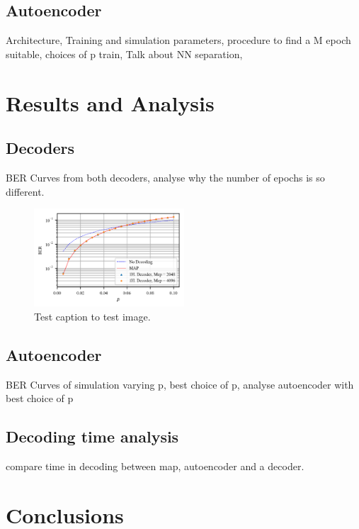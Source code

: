 \documentclass[conference]{IEEEtran}
\begin{document}
\subsection{Autoencoder}
Architecture, Training and simulation parameters, procedure to find a M epoch suitable, choices of p train, Talk about NN separation, 


\section{Results and Analysis}

\subsection{Decoders}
BER Curves from both decoders, analyse why the number of epochs is so different. 

\begin{figure}[!ht]
  \centering
    \includegraphics[width=0.5\textwidth]{images/MAP_MLNN1H_p_0}
    \caption{Test caption to test image.}\label{fig:1HD}
\end{figure}

\subsection{Autoencoder}
BER Curves of simulation varying p, best choice of p, analyse autoencoder with best choice of p


\subsection{Decoding time analysis}
compare time in decoding between map, autoencoder and a decoder.

\section{Conclusions}
\end{document}
